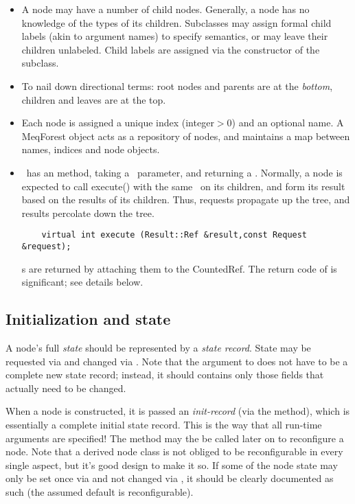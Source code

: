 \documentclass[10pt]{article}
\begin{document}
  \begin{itemize}

  \item A node may have a number of child nodes. Generally, a node has no
    knowledge of the types of its children. Subclasses may assign formal child
    labels (akin to argument names) to specify semantics, or may leave their
    children unlabeled. Child labels are assigned via the constructor of the
    subclass.

  \item To nail down directional terms: root nodes and parents are at the {\em
    bottom}, children and leaves are at the top. 

  \item Each node is assigned a unique index (integer$>$0) and an optional name. A
    MeqForest object acts as a repository of nodes, and maintains a map between
    names, indices and node objects.

  \item \Node\ has an  method, taking a \Request\ parameter,
    and returning a \Result. Normally, a node is expected to call execute()
    with the same \Request\ on its children, and form its result based on the
    results of its children. Thus, requests propagate up the tree, and results
    percolate down the tree.

\begin{verbatim}
    virtual int execute (Result::Ref &result,const Request &request);
\end{verbatim}

    \Result s are returned by attaching them to the CountedRef. The return code
    of  is significant; see details below.

  \end{itemize}

\subsection{Initialization and state}
  
  A node's full {\em state} should be represented by a {\em state record}.
  State may be requested via  and changed via .
  Note that the argument to  does not have to be a complete new state
  record; instead, it should contains only those fields that actually need to
  be changed. 

  When a node is constructed, it is passed an {\em init-record} (via the 
  method), which is essentially a complete initial state record. This is the
  way that all run-time arguments are specified! The  method may the
  be called later on to reconfigure a node. Note that a derived node class is
  not obliged to be reconfigurable in every single aspect, but it's good design
  to make it so. If some of the node state may only be set once via  and
  not changed via , it should be clearly documented as such (the
  assumed default is reconfigurable).
\end{document}
